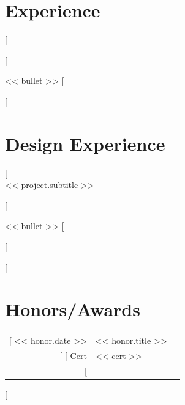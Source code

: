 \documentclass[letterpaper]{deedy-resume}
\begin{document}
\begin{minipage}[t]{0.66\textwidth} 

\section{Experience}
[%
\vspace{\topsep} 
\begin{tightemize}
    [%
    \item << bullet >>
    [%
\end{tightemize}
\sectionsep 
[%

\section{Design Experience}
[%
 \\
<< project.subtitle >>
\begin{tightemize}
    [%
    \item << bullet >>
    [%
\end{tightemize}
\sectionsep 
[%

[%
\section{Honors/Awards} 
\begin{tabular}{rll}
[%
<< honor.date >> & << honor.title >> \\
[%
[%
Cert & << cert >> \\
[%
\end{tabular}
\sectionsep 
[%
\end{minipage} 
\end{document}
